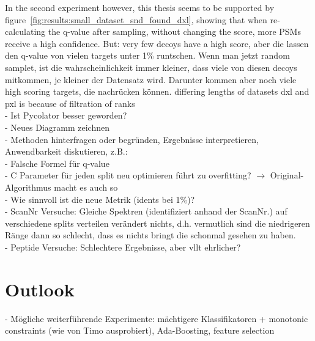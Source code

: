 In the second experiment however, this thesis seems to be supported by figure~\ref{fig:results:small_dataset_snd_found_dxl}, showing that when re-calculating the q-value after sampling, without changing the score, more PSMs receive a high confidence. But: very few decoys have a high score, aber die lassen den q-value von vielen targets unter 1\% runtschen. Wenn man jetzt random samplet, ist die wahrscheinlichkeit immer kleiner, dass viele von diesen decoys mitkommen, je kleiner der Datensatz wird. Darunter kommen aber noch viele high scoring targets, die nachrücken können. 
differing lengths of datasets dxl and pxl is because of filtration of ranks\\

- Ist Pycolator besser geworden?\\
- Neues Diagramm zeichnen\\
- Methoden hinterfragen oder begründen, Ergebnisse interpretieren, Anwendbarkeit diskutieren, z.B.:\\
- Falsche Formel für q-value\\
- C Parameter für jeden split neu optimieren führt zu overfitting? $\rightarrow$ Original-Algorithmus macht es auch so\\
- Wie sinnvoll ist die neue Metrik (idents bei 1\%)?\\
- ScanNr Versuche: Gleiche Spektren (identifiziert anhand der ScanNr.) auf verschiedene splits verteilen verändert nichts, d.h. vermutlich sind die niedrigeren Ränge dann so schlecht, dass es nichts bringt die schonmal gesehen zu haben.\\
- Peptide Versuche: Schlechtere Ergebnisse, aber vllt ehrlicher?\\
\section{Outlook}
- Mögliche weiterführende Experimente: mächtigere Klassifikatoren + monotonic constraints (wie von Timo ausprobiert), Ada-Boosting, feature selection
